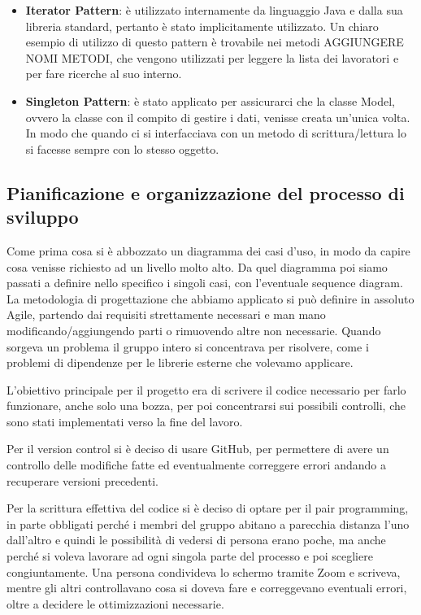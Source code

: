 \documentclass{article}
\begin{document}
    \begin{itemize}
        \item[] \textbf{Iterator Pattern}: è utilizzato internamente da linguaggio Java e dalla sua
libreria standard, pertanto è stato implicitamente utilizzato. Un chiaro esempio di utilizzo di
questo pattern è trovabile nei metodi AGGIUNGERE NOMI METODI, che vengono utilizzati per leggere la lista dei lavoratori e per fare ricerche al suo interno.
        \item[] \textbf{Singleton Pattern}: è stato applicato per assicurarci che la classe Model, ovvero la classe con il compito di gestire i dati, venisse creata un'unica volta. In modo che quando ci si interfacciava con un metodo di scrittura/lettura lo si facesse sempre con lo stesso oggetto.
    \end{itemize}

    \subsection{Pianificazione e organizzazione del processo di sviluppo}

    Come prima cosa si è abbozzato un diagramma dei casi d'uso, in modo da capire cosa venisse richiesto ad un livello molto alto. Da quel diagramma poi siamo passati a definire nello specifico i singoli casi, con l'eventuale sequence diagram. La metodologia di progettazione che abbiamo applicato si può definire in assoluto Agile, partendo dai requisiti strettamente necessari e man mano modificando/aggiungendo parti o rimuovendo altre non necessarie. Quando sorgeva un problema il gruppo intero si concentrava per risolvere, come i problemi di dipendenze per le librerie esterne che volevamo applicare.
    
    L'obiettivo principale per il progetto era di scrivere il codice necessario per farlo funzionare, anche solo una bozza, per poi concentrarsi sui possibili controlli, che sono stati implementati verso la fine del lavoro.


    Per il version control si è deciso di usare GitHub, per permettere di avere un controllo delle modifiche fatte ed eventualmente correggere errori andando a recuperare versioni precedenti.

    Per la scrittura effettiva del codice si è deciso di optare per il pair programming, in parte obbligati perché i membri del gruppo abitano a parecchia distanza l'uno dall'altro e quindi le possibilità di vedersi di persona erano poche, ma anche perché si voleva lavorare ad ogni singola parte del processo e poi scegliere congiuntamente. Una persona condivideva lo schermo tramite Zoom e scriveva, mentre gli altri controllavano cosa si doveva fare e correggevano eventuali errori, oltre a decidere le ottimizzazioni necessarie.
\end{document}

